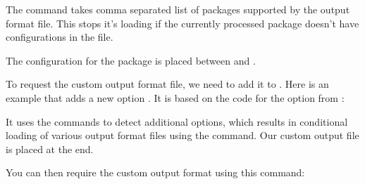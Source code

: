 The  command takes comma separated list of packages supported by the
output format file. This stops it's loading if the currently processed package doesn't 
have configurations in the file. 

The configuration for the package is placed between  and
\texcommand{\endinput\empty\empty\empty\empty\empty\empty}. 

To request the custom output format file, we need to add it to . Here
is an example that adds a new option . It is based on the code for 
the  option from :

\begin{texsource}
\end{texsource}

It uses the  commands to detect additional options, which results 
in conditional loading of various output format files using the  command. 
Our custom output file  is placed at the end.

You can then require the custom output format using this command:









